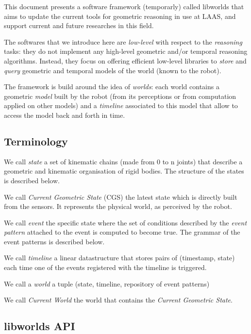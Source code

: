 \documentclass[a4paper]{article}
\begin{document}
This document presents a software framework (temporarly) called libworlds that
aims to update the current tools for geometric reasoning in use at
LAAS, and support current and future researches in this field.

The softwares that we introduce here are \emph{low-level} with respect
to the \emph{reasoning} tasks: they do not implement any high-level
geometric and/or temporal reasoning algorithms. Instead, they
focus on offering efficient low-level libraries to \emph{store} and
\emph{query} geometric and temporal models of the world (known to the
robot).

The framework is build around the idea of \emph{worlds}: each world
contains a geometric \emph{model} built by the robot (from its
perceptions or from computation applied on other models) and a
\emph{timeline} associated to this model that allow to access the model
back and forth in time.



\subsection{
  Terminology%
  \label{terminology}%
}

We call \emph{state} a set of kinematic chains (made from 0 to n
joints) that describe a geometric and kinematic organisation of
rigid bodies. The structure of the states is described below.

We call \emph{Current Geometric State} (CGS) the latest state which
is directly built from the sensors. It represents the physical
world, as perceived by the robot.

We call \emph{event} the specific state where the set of conditions
described by the \emph{event pattern} attached to the event is computed
to become true.
The grammar of the event patterns is described below.

We call \emph{timeline} a linear datastructure that stores pairs of
(timestamp, state) each time one of the events registered with the
timeline is triggered.

We call a \emph{world} a tuple (state, timeline, repository of event
patterns)

We call \emph{Current World} the world that contains the \emph{Current Geometric State}.



\subsection{
  libworlds API%
  \label{libworlds-api}%
}
\end{document}
